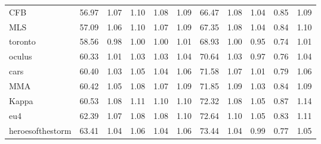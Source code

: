 \begin{tabular}{lrrrrrrrrrr}
CFB                 &          56.97 &                1.07 &                1.10 &                1.08 &                1.09 &                 66.47 &                       1.08 &                       1.04 &                       0.85 &                       1.09 \\
MLS                 &          57.09 &                1.06 &                1.10 &                1.07 &                1.09 &                 67.35 &                       1.08 &                       1.04 &                       0.84 &                       1.10 \\
toronto             &          58.56 &                0.98 &                1.00 &                1.00 &                1.01 &                 68.93 &                       1.00 &                       0.95 &                       0.74 &                       1.01 \\
oculus              &          60.33 &                1.01 &                1.03 &                1.03 &                1.04 &                 70.64 &                       1.03 &                       0.97 &                       0.76 &                       1.04 \\
cars                &          60.40 &                1.03 &                1.05 &                1.04 &                1.06 &                 71.58 &                       1.07 &                       1.01 &                       0.79 &                       1.06 \\
MMA                 &          60.42 &                1.05 &                1.08 &                1.07 &                1.09 &                 71.85 &                       1.09 &                       1.03 &                       0.84 &                       1.09 \\
Kappa               &          60.53 &                1.08 &                1.11 &                1.10 &                1.10 &                 72.32 &                       1.08 &                       1.05 &                       0.87 &                       1.14 \\
eu4                 &          62.39 &                1.07 &                1.08 &                1.08 &                1.10 &                 72.64 &                       1.10 &                       1.05 &                       0.83 &                       1.11 \\
heroesofthestorm    &          63.41 &                1.04 &                1.06 &                1.04 &                1.06 &                 73.44 &                       1.04 &                       0.99 &                       0.77 &                       1.05 \\

\end{tabular}

